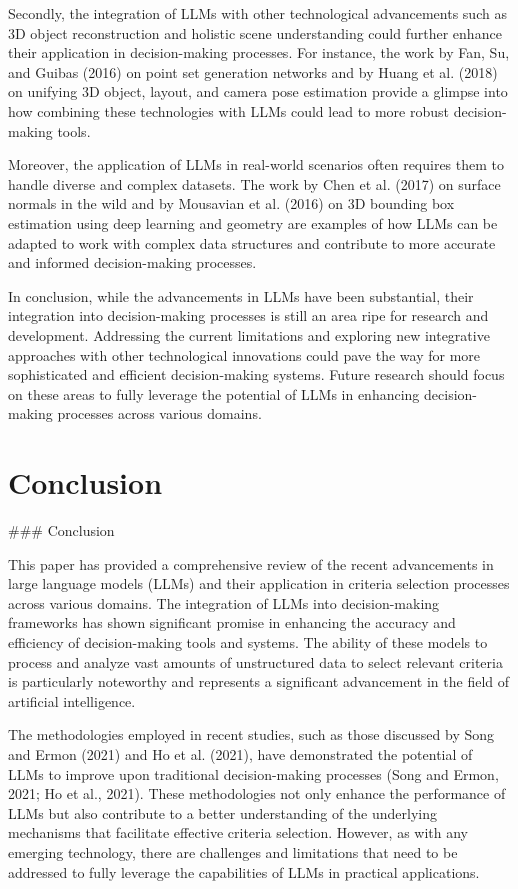 \documentclass[conference]{IEEEtran}
\begin{document}
Secondly, the integration of LLMs with other technological advancements such as 3D object reconstruction and holistic scene understanding could further enhance their application in decision-making processes. For instance, the work by Fan, Su, and Guibas (2016) on point set generation networks and by Huang et al. (2018) on unifying 3D object, layout, and camera pose estimation provide a glimpse into how combining these technologies with LLMs could lead to more robust decision-making tools.

Moreover, the application of LLMs in real-world scenarios often requires them to handle diverse and complex datasets. The work by Chen et al. (2017) on surface normals in the wild and by Mousavian et al. (2016) on 3D bounding box estimation using deep learning and geometry are examples of how LLMs can be adapted to work with complex data structures and contribute to more accurate and informed decision-making processes.

In conclusion, while the advancements in LLMs have been substantial, their integration into decision-making processes is still an area ripe for research and development. Addressing the current limitations and exploring new integrative approaches with other technological innovations could pave the way for more sophisticated and efficient decision-making systems. Future research should focus on these areas to fully leverage the potential of LLMs in enhancing decision-making processes across various domains.

\section{Conclusion}

### Conclusion

This paper has provided a comprehensive review of the recent advancements in large language models (LLMs) and their application in criteria selection processes across various domains. The integration of LLMs into decision-making frameworks has shown significant promise in enhancing the accuracy and efficiency of decision-making tools and systems. The ability of these models to process and analyze vast amounts of unstructured data to select relevant criteria is particularly noteworthy and represents a significant advancement in the field of artificial intelligence.

The methodologies employed in recent studies, such as those discussed by Song and Ermon (2021) and Ho et al. (2021), have demonstrated the potential of LLMs to improve upon traditional decision-making processes (Song and Ermon, 2021; Ho et al., 2021). These methodologies not only enhance the performance of LLMs but also contribute to a better understanding of the underlying mechanisms that facilitate effective criteria selection. However, as with any emerging technology, there are challenges and limitations that need to be addressed to fully leverage the capabilities of LLMs in practical applications.
\end{document}
